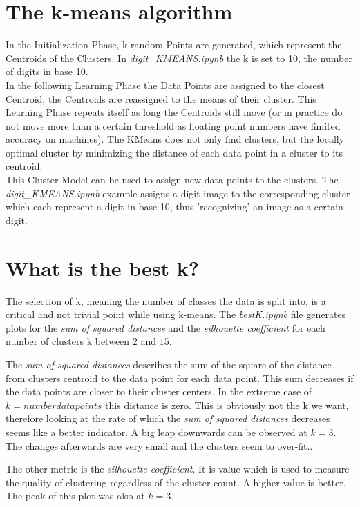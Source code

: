 \documentclass[a4paper, 11pt]{article}
\begin{document}
\section{The k-means algorithm}
In the Initialization Phase, k random Points are generated, which represent the Centroids of the Clusters. In \textit{digit\_KMEANS.ipynb} the k is set to 10, the number of digits in base 10.\\
In the following Learning Phase the Data Points are assigned to the closest Centroid, the Centroids are reassigned to the means of their cluster. This Learning Phase repeats itself as long the Centroids still move (or in practice do not move more than a certain threshold as floating point numbers have limited accuracy on machines).
The KMeans does not only find clusters, but the locally optimal cluster by minimizing the distance of each data point in a cluster to its centroid.\\
This Cluster Model can be used to assign new data points to the clusters. The \textit{digit\_KMEANS.ipynb} example assigns a digit image to the corresponding cluster which each represent a digit in base 10, thus 'recognizing' an image as a certain digit.
\section{What is the best k?}
The selection of k, meaning the number of classes the data is split into, is a critical and not trivial point while using k-means.
The \textit{bestK.ipynb} file generates plots for the \textit{sum of squared distances} and the \textit{silhouette coefficient} for each number of clusters k between $2$ and $15$.

The \textit{sum of squared distances} describes the sum of the square of the distance from clusters centroid to the data point for each data point.
This sum decreases if the data points are closer to their cluster centers.
In the extreme case of $k = number data points$ this distance is zero.
This is obviously not the k we want, therefore looking at the rate of which the \textit{sum of squared distances} decreases seems like a better indicator.
A big leap downwards can be observed at $k = 3$.
The changes afterwards are very small and the clusters seem to over-fit..

The other metric is the \textit{silhouette coefficient}.
It is value which is used to measure the quality of clustering regardless of the cluster count.
A higher value is better.
The peak of this plot was also at $k=3$.
\end{document}
